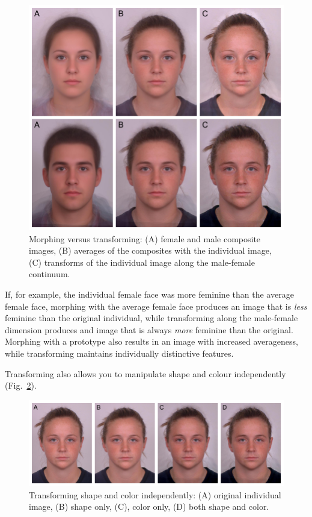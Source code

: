 \documentclass[
  doc,floatsintext]{apa6}
\begin{document}
\begin{figure}
\includegraphics[width=0.75\linewidth]{index_files/figure-latex/trans-vs-morph-1} \caption{Morphing versus transforming: (A) female and male composite images, (B) averages of the composites with the individual image, (C) transforms of the individual image along the male-female continuum.}\label{fig:trans-vs-morph}
\end{figure}

If, for example, the individual female face was more feminine than the average female face, morphing with the average female face produces an image that is \emph{less} feminine than the original individual, while transforming along the male-female dimension produces and image that is always \emph{more} feminine than the original. Morphing with a prototype also results in an image with increased averageness, while transforming maintains individually distinctive features.

Transforming also allows you to manipulate shape and colour independently (Fig.~\ref{fig:trans-shape-color}).

\begin{figure}
\includegraphics[width=1\linewidth]{index_files/figure-latex/trans-shape-color-1} \caption{Transforming shape and color independently: (A) original individual image, (B) shape only, (C), color only, (D) both shape and color.}\label{fig:trans-shape-color}
\end{figure}
\end{document}
